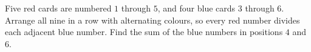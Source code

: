 Five red cards are numbered $1$ through $5$, and four blue cards $3$ through $6$. Arrange all nine in a row with alternating colours, so every red number divides each adjacent blue number. Find the sum of the blue numbers in positions $4$ and $6$.
